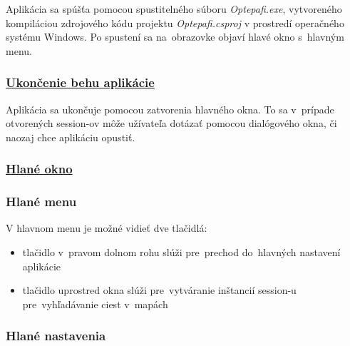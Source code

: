 \documentclass[12pt,a4paper]{report}
\begin{document}
Aplikácia sa spúšťa pomocou spustitelného súboru \textit{Optepafi.exe}, vytvoreného kompiláciou zdrojového kódu projektu \textit{Optepafi.csproj} v prostredí operačného systému Windows. Po spustení sa na~obrazovke objaví hlavé okno s~hlavným menu.

\subsubsection{\underline{Ukončenie behu aplikácie}}

Aplikácia sa ukončuje pomocou zatvorenia hlavného okna. To sa v~prípade otvorených session-ov môže užívateľa dotázať pomocou dialógového okna, či naozaj chce aplikáciu opustiť.

\pagebreak

\subsubsection{\underline{Hlané okno}}

\subsubsection{Hlané menu}

\begin{figure}[h]\centering
{}
\end{figure}

V hlavnom menu je možné vidieť dve tlačidlá:
\begin{itemize}
    \item tlačidlo v~pravom dolnom rohu slúži pre~prechod do~hlavných nastavení aplikácie
    \item tlačidlo uprostred okna slúži pre~vytváranie inštancií session-u pre~vyhľadávanie ciest v~mapách
\end{itemize}

\subsubsection{Hlané nastavenia}
\end{document}
